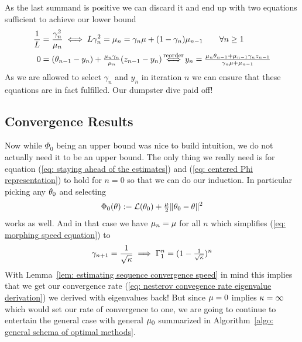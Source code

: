 As the last summand is positive we can discard it and end up with two equations
sufficient to achieve our lower bound
\begin{subequations}
\begin{align}
	\label{eq: morphing speed equation}
	\frac{1}{\ubound}
	&= \frac{\gamma_n^2}{\lbound_n}
	\iff \ubound \gamma_n^2 = \lbound_n = \gamma_n \lbound +  (1-\gamma_n)\lbound_{n-1}
	\qquad \forall n\ge 1
	\\
	0
	&= (\weights_{n-1} -y_n) + \tfrac{\lbound_n\gamma_n}{\lbound_n}(z_{n-1} - y_n)
	\xiff{\text{reorder}}
	y_n
	= \tfrac{\lbound_n\weights_{n-1} + \lbound_{n-1}\gamma_n z_{n-1}}{\gamma_n\lbound + \lbound_{n-1}}
\end{align}
\end{subequations}
As we are allowed to select \(\gamma_n\) and \(y_n\) in iteration \(n\) we
can ensure that these equations are in fact fulfilled. Our dumpster dive paid off!

\subsection{Convergence Results}

Now while \(\Phi_0\) being an upper bound was nice to build intuition, we do
not actually need it to be an upper bound. The only thing we really need is
for equation (\ref{eq: staying ahead of the estimates}) and (\ref{eq: centered
Phi representation}) to hold for \(n=0\) so that we can do our induction. In
particular picking any \(\theta_0\) and selecting
\begin{align*}
	\Phi_0(\theta):= \mathcal{L}(\theta_0) + \tfrac{\mu}{2}\|\theta_0 - \theta\|^2
\end{align*}
works as well. And in that case we have \(\mu_n = \mu\) for all \(n\)
which simplifies (\ref{eq: morphing speed equation}) to
\begin{align*}
	\gamma_{n+1} = \frac1{\sqrt{\kappa}} \implies \Gamma_1^n = (1-\tfrac{1}{\sqrt{\kappa}})^n
\end{align*}
With Lemma~\ref{lem: estimating sequence convergence speed} in mind this implies
that we get our convergence rate (\ref{eq: nesterov convegence rate eigenvalue derivation})
we derived with eigenvalues back! But since \(\mu=0\) implies \(\kappa=\infty\)
which would set our rate of convergence to one, we are going to continue
to entertain the general case with general \(\mu_0\) summarized in
Algorithm~\ref{algo: general schema of optimal methods}.

